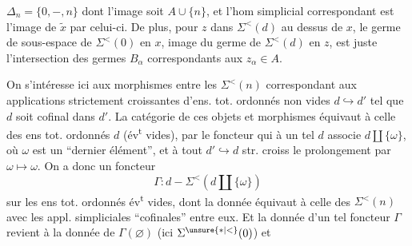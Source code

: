 $\Delta_n=\{0,-,n\}$ dont l'image soit $A\cup\{n\}$, et l'hom simplicial correspondant
est l'image de $\widetilde x$ par celui-ci. De plus, pour $z$ dans  $\Sigma^{<}(d)$ au dessus de $x$,  le germe de sous-espace de $\Sigma^{<}(0)$ en $x$, image du germe de $\Sigma^{<}(d)$ en $z$, est juste l'intersection des germes $B_\alpha$ correspondants aux $z_\alpha\in A$.

On s'intéresse ici aux morphismes entre les $\Sigma^{<}(n)$ correspondant aux applications strictement croissantes d'ens. tot. ordonnés non vides $d\hookrightarrow d'$ tel que $d$ soit cofinal dans $d'$. La catégorie de ces objets et morphismes équivaut à celle des ens tot. ordonnés $d$ (év\textsuperscript{t} vides), par le foncteur qui à un tel $d$ associe $d\coprod\{\omega\}$, où $\omega$ est un ``dernier élément'', et à tout $d'\hookrightarrow d$ str. croiss le prolongement par $\omega\mapsto\omega$. On a donc \deleted{\unsure{$\Sigma$}} un foncteur
\[
\Gamma:d-\Sigma^{<}(d\coprod\{\omega\})
\]
sur les ens tot. ordonnés év\textsuperscript{t} vides, dont la donnée équivaut à celle des $\Sigma^{<}(n)$ avec les  appl. simpliciales ``cofinales'' entre eux. Et la donnée d'un  tel foncteur $\Gamma$ revient à la donnée de $\Gamma(\varnothing)$ (ici $\Sigma^{\unsure{*|<}}(0)$) et
